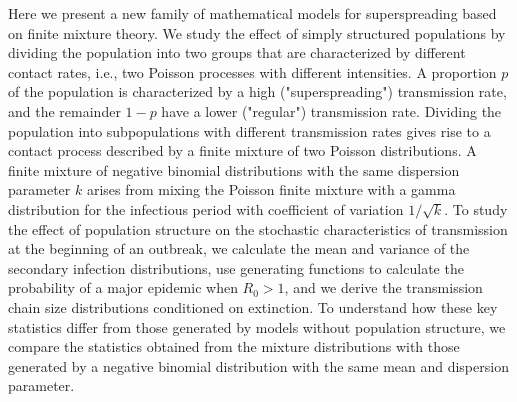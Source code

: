 \documentclass{imammb}
\numberwithin{equation}{section}
\newcommand{\comment}[1]{}
\begin{document}
Here we present a new family of mathematical models for superspreading based on finite mixture theory. We study the effect of simply structured populations by dividing the population into two groups that are characterized by different contact rates, i.e., two Poisson processes with different intensities. A proportion $p$ of the population is characterized by a high ("superspreading") transmission rate, and the remainder $1-p$ have a lower ("regular") transmission rate. Dividing the population into subpopulations with different transmission rates gives rise to a contact process described by a finite mixture of two Poisson distributions. A finite mixture of negative binomial distributions with the same dispersion parameter $k$ arises from mixing the Poisson finite mixture with a gamma distribution for the infectious period with coefficient of variation $1/\sqrt{k}$. \comment{Then a finite mixture of geometric distributions (i.e.,with $k=1$) and a finite mixture of Poisson distributions (with $k\rightarrow \infty$) arise as special cases.\footnote{Unclear if these are three separate models -- mixed Poisson, mixed NB, and mixed geometric -- or different versions of the same thing. I think some transition language linking the three sentences would be helpful. SO: Hopefully this has been made more clear.}

}To study the effect of population structure on the stochastic characteristics of transmission at the beginning of an outbreak, we calculate the mean and variance of the secondary infection distributions, use generating functions to calculate the probability of a major epidemic when $R_0>1$, and we derive the transmission chain size distributions conditioned on extinction. To understand how these key statistics differ from those generated by models without population structure, we compare the statistics obtained from the mixture distributions with those generated by a negative binomial distribution with the same mean and dispersion parameter. 
\end{document}

